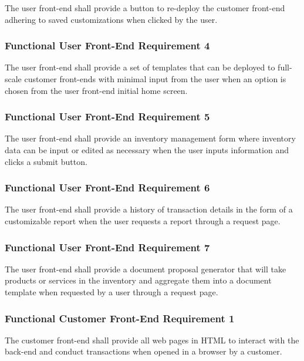 \documentclass{article}
\begin{document}
The user front-end shall provide a button to re-deploy the customer front-end
adhering to saved customizations when clicked by the user.

\subsubsection{Functional User Front-End Requirement 4}
\label{func-user-front-end-4}

The user front-end shall provide a set of templates that can be deployed to
full-scale customer front-ends with minimal input from the user when an option
is chosen from the user front-end initial home screen.

\subsubsection{Functional User Front-End Requirement 5}
\label{func-user-front-end-5}

The user front-end shall provide an inventory management form where inventory
data can be input or edited as necessary when the user inputs information and
clicks a submit button.

\subsubsection{Functional User Front-End Requirement 6}
\label{func-user-front-end-6}

The user front-end shall provide a history of transaction details in the form
of a customizable report when the user requests a report through a request page.

\subsubsection{Functional User Front-End Requirement 7}
\label{func-user-front-end-7}

The user front-end shall provide a document proposal generator that will take
products or services in the inventory and aggregate them into a document
template when requested by a user through a request page.

\subsubsection{Functional Customer Front-End Requirement 1}
\label{func-cust-front-end-1}

The customer front-end shall provide all web pages in HTML to interact with the
back-end and conduct transactions when opened in a browser by a customer.
\end{document}

